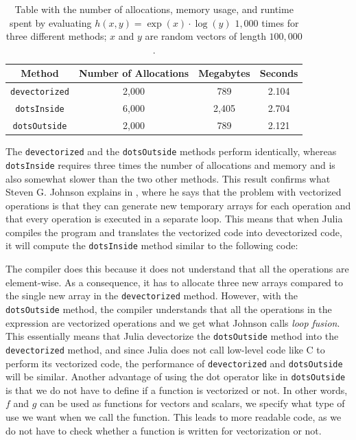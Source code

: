 \begin{table}[H]
    \centering
    \caption{Table  with  the  number  of  allocations,  memory  usage,  and  runtime  spent  by  evaluating $h(x,y) = \exp(x)\cdot\log(y)$ $1,000$ times for three different methods; $x$ and $y$ are random vectors of length $100,000$.}
    \label{tab:dotOperator}
    \def\arraystretch{1.5}
    \begin{tabular}{cccc}
    \textbf{Method} & \textbf{Number of Allocations} & \textbf{Megabytes} & \textbf{Seconds} \\
        \hline
         \texttt{devectorized} & 2,000 & 789 & 2.104 \\
         \texttt{dotsInside} & 6,000 & 2,405 & 2.704 \\ 
         \texttt{dotsOutside} & 2,000 & 789 & 2.121 \\  
         \hline
    \end{tabular}
\end{table}
The \texttt{devectorized} and the \texttt{dotsOutside} methods perform  identically, whereas \texttt{dotsInside} requires three times the number of allocations and memory and is also somewhat slower than the two other methods. This result confirms what Steven G. Johnson explains in \emph{\cite{MoreDotsJuliaBlog}}, where he says that the problem with vectorized operations is that they can generate new temporary arrays for each operation and that every operation is executed in a separate loop. This means that when Julia compiles the program and translates the vectorized code into devectorized code, it will compute the \texttt{dotsInside} method similar to the following code:

The compiler does this because it does not understand that all the operations are element-wise. As a consequence, it has to allocate three new arrays compared to the single new array in the \texttt{devectorized} method. However, with the \texttt{dotsOutside} method, the compiler understands that all the operations in the expression are vectorized operations and we get what Johnson calls \textit{loop fusion}. This essentially means that Julia devectorize the \texttt{dotsOutside} method into the \texttt{devectorized} method, and since Julia does not call low-level code like C to perform its vectorized code, the performance of \texttt{devectorized} and \texttt{dotsOutside} will be similar. Another advantage of using the dot operator like in \texttt{dotsOutside} is that we do not have to define if a function is vectorized or not. In other words, $f$ and $g$ can be used as functions for vectors and scalars, we specify what type of use we want when we call the function. This leads to more readable code, as we do not have to check whether a function is written for vectorization or not.

